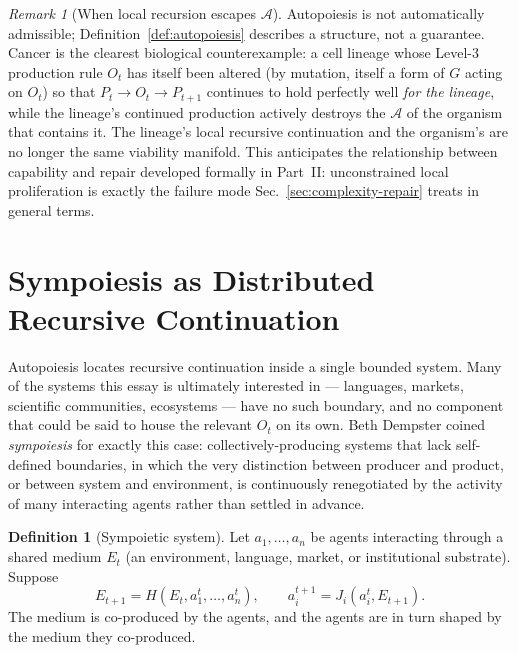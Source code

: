 \documentclass[11pt,a4paper]{article}
\theoremstyle{plain}
\theoremstyle{definition}
\newtheorem{definition}[theorem]{Definition}
\theoremstyle{remark}
\newtheorem{remark}[theorem]{Remark}
\newcommand{\Adm}{\mathcal{A}}
\begin{document}
\begin{remark}[When local recursion escapes $\Adm$]
\label{rem:cancer-preview}
Autopoiesis is not automatically admissible; Definition~\ref{def:autopoiesis} describes a structure, not a guarantee. Cancer is the clearest biological counterexample: a cell lineage whose Level-3 production rule $O_t$ has itself been altered (by mutation, itself a form of $G$ acting on $O_t$) so that $P_t \to O_t \to P_{t+1}$ continues to hold perfectly well \emph{for the lineage}, while the lineage's continued production actively destroys the $\Adm$ of the organism that contains it. The lineage's local recursive continuation and the organism's are no longer the same viability manifold. This anticipates the relationship between capability and repair developed formally in Part~II: unconstrained local proliferation is exactly the failure mode Sec.~\ref{sec:complexity-repair} treats in general terms.
\end{remark}

\section{Sympoiesis as Distributed Recursive Continuation}
\label{sec:sympoiesis}

Autopoiesis locates recursive continuation inside a single bounded system. Many of the systems this essay is ultimately interested in — languages, markets, scientific communities, ecosystems — have no such boundary, and no component that could be said to house the relevant $O_t$ on its own. Beth Dempster coined \emph{sympoiesis} for exactly this case: collectively-producing systems that lack self-defined boundaries, in which the very distinction between producer and product, or between system and environment, is continuously renegotiated by the activity of many interacting agents rather than settled in advance.

\begin{definition}[Sympoietic system]
\label{def:sympoiesis}
Let $a_1, \ldots, a_n$ be agents interacting through a shared medium $E_t$ (an environment, language, market, or institutional substrate). Suppose
\[
E_{t+1} = H(E_t, a_1^t, \ldots, a_n^t), \qquad a_i^{t+1} = J_i(a_i^t, E_{t+1}).
\]
The medium is co-produced by the agents, and the agents are in turn shaped by the medium they co-produced.
\end{definition}
\end{document}
